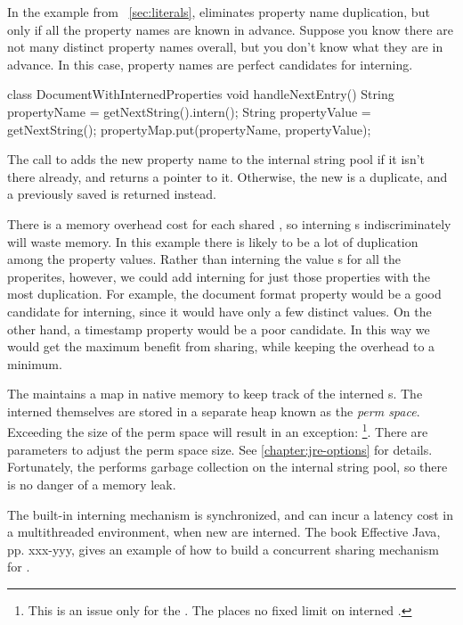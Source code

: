 In the example from ~\autoref{sec:literals},
 eliminates property
name duplication, but only if all the property names are known in advance.
Suppose you know there are not many distinct property names overall, but you
don't know what they are in advance. In this case, property names
are perfect candidates for  interning.
\begin{shortlisting}
 
 class DocumentWithInternedProperties {
    void handleNextEntry() {
       String propertyName = getNextString().intern(); 
       String propertyValue = getNextString();
       propertyMap.put(propertyName, propertyValue);
    }
}
\end{shortlisting}

The call to  adds the new property name 
to the internal string
pool if it isn't there already, and returns a pointer to it. Otherwise, the
new  is a duplicate, and a previously saved  is
returned instead. 

There is a memory overhead cost for each shared
, so interning s indiscriminately will waste memory.
In this example there is likely to be a lot of duplication
among the property values. Rather than interning the value s for
all the properites, however, we could add interning for just those
properties with the most duplication. For example, the document format
property would be a good candidate for interning, since it would have only
a few distinct values.
On the other hand, a timestamp property would be a poor candidate. In this way
we would get the maximum benefit from sharing, while keeping the overhead to a
minimum. 

The \jre maintains a map in native memory to keep track of the interned
s.
The interned  themselves are stored in a separate heap known as
the \emph{perm space}. 
Exceeding the size of the perm space will result in an exception:
\footnote{This is an issue only for the \oracle \jre. The \ibm \jre places no 
fixed limit on interned .}.
There are parameters to adjust the perm space size. See \autoref{chapter:jre-options} for details. 
Fortunately, the \jre performs garbage collection on the
internal string pool, so there is no danger of a memory leak.

The built-in interning mechanism is synchronized, and can incur a latency cost
in a multithreaded environment, when new  are interned.
The book Effective Java\cite{EffectiveJavaBook}, pp. xxx-yyy, gives an example
of how to build a concurrent sharing mechanism for .

